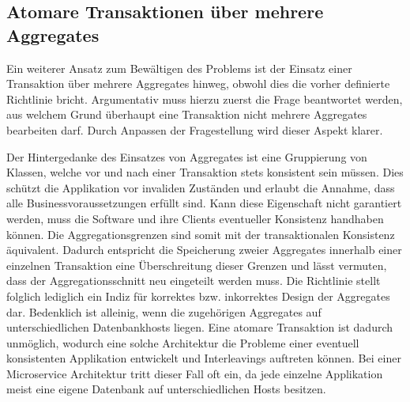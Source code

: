 \subsection{Atomare Transaktionen über mehrere Aggregates}

Ein weiterer Ansatz zum Bewältigen des Problems ist der Einsatz einer Transaktion über mehrere Aggregates hinweg, obwohl dies die vorher definierte Richtlinie bricht. Argumentativ muss hierzu zuerst die Frage beantwortet werden, aus welchem Grund überhaupt eine Transaktion nicht mehrere Aggregates bearbeiten darf. Durch Anpassen der Fragestellung wird dieser Aspekt klarer. 

Der Hintergedanke des Einsatzes von Aggregates ist eine Gruppierung von Klassen, welche vor und nach einer Transaktion stets konsistent sein müssen. Dies schützt die Applikation vor invaliden Zuständen und erlaubt die Annahme, dass alle Businessvoraussetzungen erfüllt sind. Kann diese Eigenschaft nicht garantiert werden, muss die Software und ihre Clients eventueller Konsistenz handhaben können. Die Aggregationsgrenzen sind somit mit der transaktionalen Konsistenz äquivalent. Dadurch entspricht die Speicherung zweier Aggregates innerhalb einer einzelnen Transaktion eine Überschreitung dieser Grenzen und lässt vermuten, dass der Aggregationsschnitt neu eingeteilt werden muss. Die Richtlinie stellt folglich lediglich ein Indiz für korrektes bzw. inkorrektes Design der Aggregates dar. Bedenklich ist alleinig, wenn die zugehörigen Aggregates auf unterschiedlichen Datenbankhosts liegen. Eine atomare Transaktion ist dadurch unmöglich, wodurch eine solche Architektur die Probleme einer eventuell konsistenten Applikation entwickelt und Interleavings auftreten können. Bei einer Microservice Architektur tritt dieser Fall oft ein, da jede einzelne Applikation meist eine eigene Datenbank auf unterschiedlichen Hosts besitzen.

